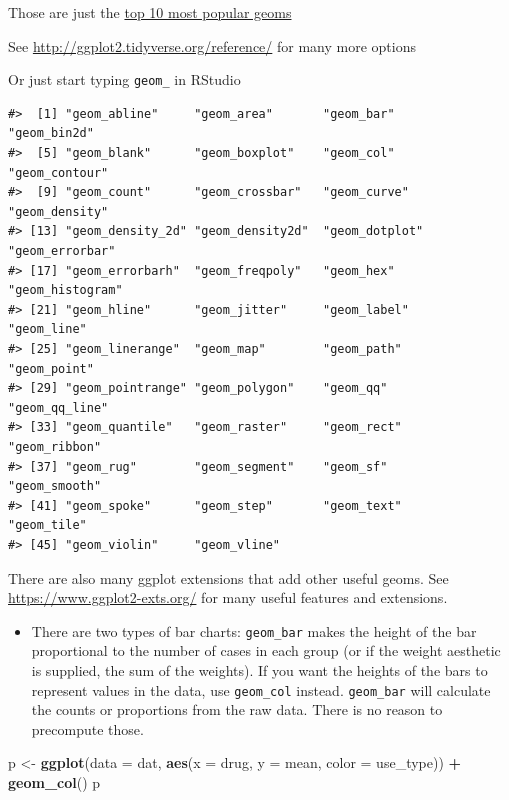 \documentclass[]{book}
\newenvironment{Shaded}{\begin{snugshade}}{\end{snugshade}}
\newcommand{\KeywordTok}[1]{\textcolor[rgb]{0.13,0.29,0.53}{\textbf{#1}}}
\newcommand{\DataTypeTok}[1]{\textcolor[rgb]{0.13,0.29,0.53}{#1}}
\newcommand{\StringTok}[1]{\textcolor[rgb]{0.31,0.60,0.02}{#1}}
\newcommand{\OperatorTok}[1]{\textcolor[rgb]{0.81,0.36,0.00}{\textbf{#1}}}
\newcommand{\NormalTok}[1]{#1}
\newenvironment{rmdblock}[1]
  {\begin{shaded*}
  \begin{itemize}
  \renewcommand{\labelitemi}{
    \raisebox{-.7\height}[0pt][0pt]{
      {\setkeys{Gin}{width=3em,keepaspectratio}\texttt{[image: images/\#1]}}
    }
  }
  \item
  }
  {
  \end{itemize}
  \end{shaded*}
  }
\newenvironment{rmdnote}
  {\begin{rmdblock}{note}}
  {\end{rmdblock}}
\theoremstyle{definition}
\theoremstyle{definition}
\theoremstyle{definition}
\theoremstyle{remark}
\begin{document}
Those are just the
\href{https://eric.netlify.com/2017/08/10/most-popular-ggplot2-geoms/}{top
10 most popular geoms}

See \url{http://ggplot2.tidyverse.org/reference/} for many more options

Or just start typing \texttt{geom\_} in RStudio

\begin{verbatim}
#>  [1] "geom_abline"     "geom_area"       "geom_bar"        "geom_bin2d"     
#>  [5] "geom_blank"      "geom_boxplot"    "geom_col"        "geom_contour"   
#>  [9] "geom_count"      "geom_crossbar"   "geom_curve"      "geom_density"   
#> [13] "geom_density_2d" "geom_density2d"  "geom_dotplot"    "geom_errorbar"  
#> [17] "geom_errorbarh"  "geom_freqpoly"   "geom_hex"        "geom_histogram" 
#> [21] "geom_hline"      "geom_jitter"     "geom_label"      "geom_line"      
#> [25] "geom_linerange"  "geom_map"        "geom_path"       "geom_point"     
#> [29] "geom_pointrange" "geom_polygon"    "geom_qq"         "geom_qq_line"   
#> [33] "geom_quantile"   "geom_raster"     "geom_rect"       "geom_ribbon"    
#> [37] "geom_rug"        "geom_segment"    "geom_sf"         "geom_smooth"    
#> [41] "geom_spoke"      "geom_step"       "geom_text"       "geom_tile"      
#> [45] "geom_violin"     "geom_vline"
\end{verbatim}

There are also many ggplot extensions that add other useful geoms. See
\url{https://www.ggplot2-exts.org/} for many useful features and
extensions.

\begin{rmdnote}
There are two types of bar charts: \texttt{geom\_bar} makes the height
of the bar proportional to the number of cases in each group (or if the
weight aesthetic is supplied, the sum of the weights). If you want the
heights of the bars to represent values in the data, use
\texttt{geom\_col} instead. \texttt{geom\_bar} will calculate the counts
or proportions from the raw data. There is no reason to precompute
those.
\end{rmdnote}

\begin{Shaded}
\begin{Highlighting}[]
\NormalTok{p <-}\StringTok{ }\KeywordTok{ggplot}\NormalTok{(}\DataTypeTok{data =}\NormalTok{ dat, }\KeywordTok{aes}\NormalTok{(}\DataTypeTok{x =}\NormalTok{ drug, }\DataTypeTok{y =}\NormalTok{ mean, }\DataTypeTok{color =}\NormalTok{ use_type)) }\OperatorTok{+}
\StringTok{  }\KeywordTok{geom_col}\NormalTok{()}
\NormalTok{p}
\end{Highlighting}
\end{Shaded}
\end{document}
